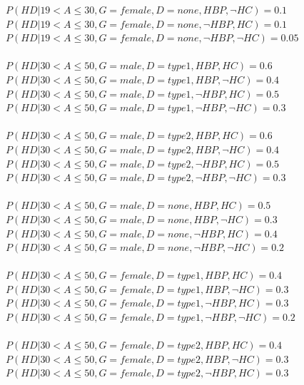 \documentclass{article}
\begin{document}
$P(HD | 19 < A \leq 30, G = female, D = none, HBP, \neg HC) = 0.1$\\
$P(HD | 19 < A \leq 30, G = female, D = none, \neg HBP, HC) = 0.1$\\
$P(HD | 19 < A \leq 30, G = female, D = none, \neg HBP, \neg HC) = 0.05$\\
\\
$P(HD | 30 < A \leq 50, G = male, D = type1, HBP, HC) = 0.6 $\\
$P(HD | 30 < A \leq 50, G = male, D = type1, HBP, \neg HC) = 0.4$\\
$P(HD | 30 < A \leq 50, G = male, D = type1, \neg HBP, HC) = 0.5$\\
$P(HD | 30 < A \leq 50, G = male, D = type1, \neg HBP, \neg HC) = 0.3$\\
\\
$P(HD | 30 < A \leq 50, G = male, D = type2, HBP, HC) = 0.6$\\
$P(HD | 30 < A \leq 50, G = male, D = type2, HBP, \neg HC) = 0.4$\\
$P(HD | 30 < A \leq 50, G = male, D = type2, \neg HBP, HC) = 0.5$\\
$P(HD | 30 < A \leq 50, G = male, D = type2, \neg HBP, \neg HC) = 0.3$\\
\\
$P(HD | 30 < A \leq 50, G = male, D = none, HBP, HC) = 0.5 $\\
$P(HD | 30 < A \leq 50, G = male, D = none, HBP, \neg HC) = 0.3$\\
$P(HD | 30 < A \leq 50, G = male, D = none, \neg HBP, HC) = 0.4$\\
$P(HD | 30 < A \leq 50, G = male, D = none, \neg HBP, \neg HC) = 0.2$\\
\\
$P(HD | 30 < A \leq 50, G = female, D = type1, HBP, HC) = 0.4 $\\
$P(HD | 30 < A \leq 50, G = female, D = type1, HBP, \neg HC) = 0.3$\\
$P(HD | 30 < A \leq 50, G = female, D = type1, \neg HBP, HC) = 0.3$\\
$P(HD | 30 < A \leq 50, G = female, D = type1, \neg HBP, \neg HC) = 0.2$\\
\\
$P(HD | 30 < A \leq 50, G = female, D = type2, HBP, HC) = 0.4 $\\
$P(HD | 30 < A \leq 50, G = female, D = type2, HBP, \neg HC) = 0.3$\\
$P(HD | 30 < A \leq 50, G = female, D = type2, \neg HBP, HC) = 0.3$\\
\end{document}
